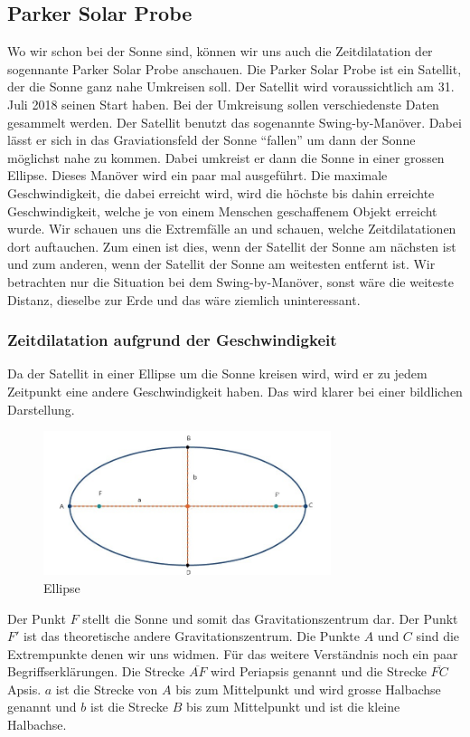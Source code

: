 \begin{refsection}
\subsection{Parker Solar Probe}
%
Wo wir schon bei der Sonne sind, können wir uns auch die Zeitdilatation der sogennante Parker Solar Probe anschauen. Die Parker Solar Probe ist ein Satellit, der die Sonne ganz nahe Umkreisen soll. Der Satellit wird voraussichtlich am 31. Juli 2018 seinen Start haben. Bei der Umkreisung sollen verschiedenste Daten gesammelt werden. Der Satellit benutzt das sogenannte Swing-by-Manöver. Dabei lässt er sich in das Graviationsfeld der Sonne ``fallen'' um dann der Sonne möglichst nahe zu kommen. Dabei umkreist er dann die Sonne in einer grossen Ellipse. Dieses Manöver wird ein paar mal ausgeführt. Die maximale Geschwindigkeit, die dabei erreicht wird, wird die höchste bis dahin erreichte Geschwindigkeit, welche je von einem Menschen geschaffenem Objekt erreicht wurde. Wir schauen uns die Extremfälle an und schauen, welche Zeitdilatationen dort auftauchen. Zum einen ist dies, wenn der Satellit der Sonne am nächsten ist und zum anderen, wenn der Satellit der Sonne am weitesten entfernt ist. Wir betrachten nur die Situation bei dem Swing-by-Manöver, sonst wäre die weiteste Distanz, dieselbe zur Erde und das wäre ziemlich uninteressant. 

\subsubsection{Zeitdilatation aufgrund der Geschwindigkeit}
Da der Satellit in einer Ellipse um die Sonne kreisen wird, wird er zu jedem Zeitpunkt eine andere Geschwindigkeit haben. Das wird klarer bei einer bildlichen Darstellung.
\begin{figure}[h]
\centering
\includegraphics[width=0.75\textwidth]{gps/pictures/Ellipse.jpg}
\caption{Ellipse}
\label{pic:ellipse}
\end{figure}
Der Punkt $F$ stellt die Sonne und somit das Gravitationszentrum dar. Der Punkt $F'$ ist das theoretische andere Gravitationszentrum. Die Punkte $A$ und $C$ sind die Extrempunkte denen wir uns widmen. Für das weitere Verständnis noch ein paar Begriffserklärungen. Die Strecke $\overline{AF}$ wird Periapsis genannt und die Strecke $\overline{FC}$ Apsis. $a$ ist die Strecke von $A$ bis zum Mittelpunkt und wird grosse Halbachse genannt und $b$ ist die Strecke $B$ bis zum Mittelpunkt und ist die kleine Halbachse.


\end{refsection}
